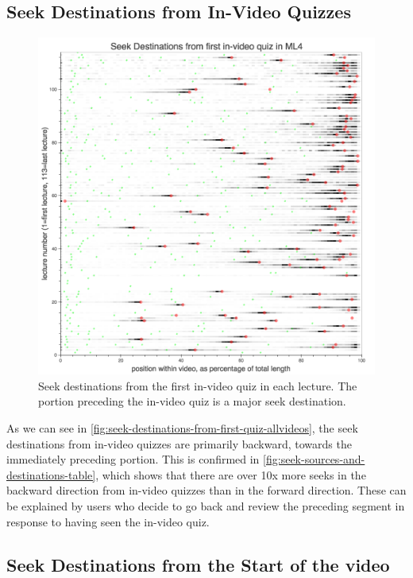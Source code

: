 \documentclass{sigchi}
\begin{document}
\subsection{Seek Destinations from In-Video Quizzes}

\begin{figure}
\includegraphics[width=1.0\columnwidth]{seek-destinations-from-first-quiz-allvideos}
\caption{Seek destinations from the first in-video quiz in each lecture. The portion preceding the in-video quiz is a major seek destination.}
\label{fig:seek-destinations-from-first-quiz-allvideos}
\end{figure}

As we can see in \autoref{fig:seek-destinations-from-first-quiz-allvideos}, the seek destinations from in-video quizzes are primarily backward, towards the immediately preceding portion. This is confirmed in \autoref{fig:seek-sources-and-destinations-table}, which shows that there are over 10x more seeks in the backward direction from in-video quizzes than in the forward direction. These can be explained by users who decide to go back and review the preceding segment in response to having seen the in-video quiz.


\subsection{Seek Destinations from the Start of the video}
\end{document}
